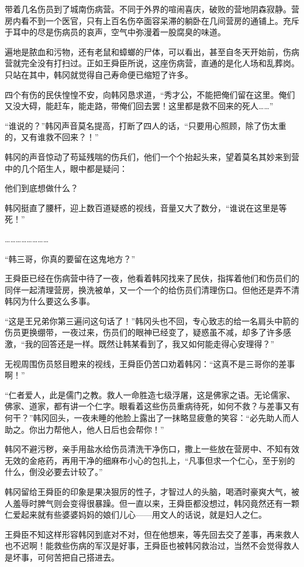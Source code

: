 带着几名伤员到了城南伤病营。不同于外界的喧闹喜庆，破败的营地阴森寂静。营房内看不到一个医官，只有上百名伤卒面容呆滞的躺卧在几间营房的通铺上。充斥于耳中的尽是伤病员的哀声，空气中弥漫着一股腐臭的味道。

遍地是脓血和污物，还有老鼠和蟑螂的尸体，可以看出，甚至自冬天开始前，伤病营就完全没有打扫过。正如王舜臣所说，这座伤病营，直通的是化人场和乱葬岗。只站在其中，韩冈就觉得自己寿命便已缩短了许多。

四个有伤的民伕惶惶不安，向韩冈恳求道，“秀才公，不能把俺们留在这里。俺们又没大碍，能赶车，能走路，带俺们回去罢！这里都是救不回来的死人……”

“谁说的？”韩冈声音莫名提高，打断了四人的话，“只要用心照顾，除了伤太重的，又有谁救不回来？！”

韩冈的声音惊动了苟延残喘的伤兵们，他们一个个抬起头来，望着莫名其妙来到营中的几个陌生人，眼中都是疑问：

他们到底想做什么？

韩冈挺直了腰杆，迎上数百道疑惑的视线，音量又大了数分，“谁说在这里是等死！”

……………………

“韩三哥，你真的要留在这鬼地方？”

王舜臣已经在伤病营中待了一夜，他看着韩冈找来了民伕，指挥着他们和伤员们的同伴一起清理营房，换洗被单，又一个一个的给伤员们清理伤口。但他还是弄不清韩冈为什么要这么多事。

“这是王兄弟你第三遍问这句话了！”韩冈头也不回，专心致志的给一名肩头中箭的伤员更换绷带，一夜过来，伤员们的眼神已经变了，疑惑虽不减，却多了许多感激，“我的回答还是一样。既然让韩某看到了，我又如何能走得心安理得？”

无视周围伤员怒目瞪来的视线，王舜臣仍苦口劝着韩冈：“这真不是三哥你的差事啊！”

“仁者爱人，此是儒门之教。救人一命胜造七级浮屠，这是佛家之语。无论儒家、佛家、道家，都有讲一个仁字。眼看着这些伤员重病待死，如何不救？与差事又有何干？”韩冈回头，一夜未睡的他脸上露出了一抹略显疲惫的笑容：“必先助人而人助之。你出力帮他人，他人日后也会帮你！”

韩冈不避污秽，亲手用盐水给伤员清洗干净伤口，撒上一些放在营房中、不知有效无效的金疮药，再用干净的细麻布小心的包扎上，“凡事但求一个仁心，至于别的什么，倒没必要去计较了。”

韩冈留给王舜臣的印象是果决狠厉的性子，才智过人的头脑，喝酒时豪爽大气，被人羞辱时脾气则会变得很暴躁。但一直以来，王舜臣都没想过，韩冈竟然还有一颗仁爱起来就有些婆婆妈妈的娘们儿心——用文人的话说，就是妇人之仁。

王舜臣不知这样形容韩冈到底对不对，但在他想来，等先回去交了差事，再来救人也不迟啊！能救些伤病的军汉是好事，王舜臣也被韩冈救治过，当然不会觉得救人是坏事，可何苦把自己搭进去。


